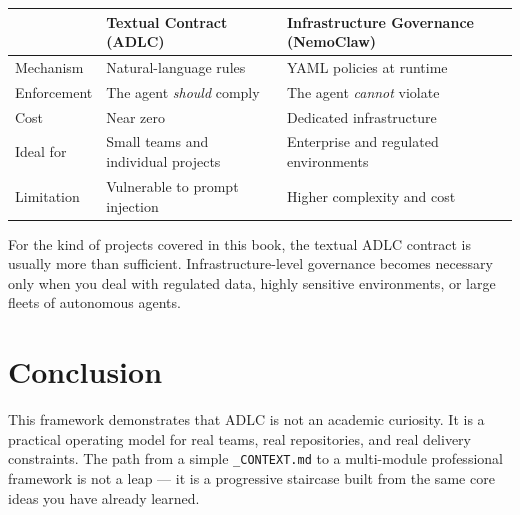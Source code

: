 \begin{center}
\begin{tabularx}{\textwidth}{l X X}
\toprule
& \textbf{Textual Contract (ADLC)} & \textbf{Infrastructure Governance (NemoClaw)} \\
\midrule
Mechanism & Natural-language rules & YAML policies at runtime \\
Enforcement & The agent \emph{should} comply & The agent \emph{cannot} violate \\
Cost & Near zero & Dedicated infrastructure \\
Ideal for & Small teams and individual projects & Enterprise and regulated environments \\
Limitation & Vulnerable to prompt injection & Higher complexity and cost \\
\bottomrule
\end{tabularx}
\end{center}

\begin{notebox}
For the kind of projects covered in this book, the textual ADLC contract is usually more than sufficient. Infrastructure-level governance becomes necessary only when you deal with regulated data, highly sensitive environments, or large fleets of autonomous agents.
\end{notebox}

\section*{Conclusion}

This framework demonstrates that ADLC is not an academic curiosity. It is a practical operating model for real teams, real repositories, and real delivery constraints. The path from a simple \texttt{\_CONTEXT.md} to a multi-module professional framework is not a leap --- it is a progressive staircase built from the same core ideas you have already learned.
